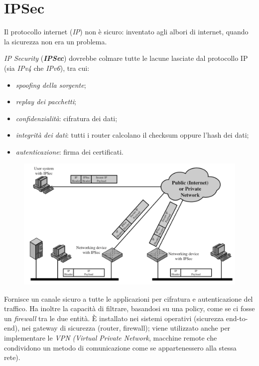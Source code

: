 \documentclass[11pt, a4paper, twoside, italian]{report}
\theoremstyle{plain}
\begin{document}
\section*{IPSec}
Il protocollo internet (\textit{IP}) non è sicuro: inventato agli albori di internet, quando la sicurezza non era un problema.
\begin{multicols}{2}
	\noindent
\textit{IP Security} (\textbf{\textit{IPSec}}) dovrebbe colmare tutte le lacune lasciate dal protocollo IP (sia \textit{IPv4} che \textit{IPv6}), tra cui:
\begin{itemize}
	\item \textit{spoofing della sorgente};
	\item \textit{replay dei pacchetti};
	\item \textit{confidenzialità}: cifratura dei dati;
	\item \textit{integrità dei dati}: tutti i router calcolano il checksum oppure l'hash dei dati;
	\item \textit{autenticazione}: firma dei certificati.
\end{itemize}
\columnbreak
\begin{figure}[H]
	\centering
	\includegraphics[scale=0.5]{ipsecscenario}
\end{figure}
\end{multicols}
\noindent
Fornisce un canale sicuro a tutte le applicazioni per cifratura e autenticazione del traffico. Ha inoltre la capacità di filtrare, basandosi su una policy, come se ci fosse un \textit{firewall} tra le due entità. È installato nei sistemi operativi (sicurezza end-to-end), nei gateway di sicurezza (router, firewall); viene utilizzato anche per implementare le \textit{VPN (Virtual Private Network}, macchine remote che condividono un metodo di comunicazione come se appartenessero alla stessa rete).\\\\
\end{document}
